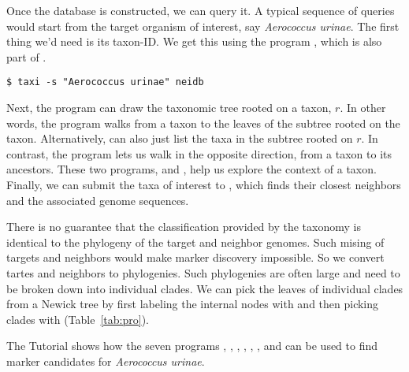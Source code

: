 Once the database is constructed, we can query it. A typical sequence
of queries would start from the target organism of interest,
say \emph{Aerococcus urinae}. The first thing we'd need is its
taxon-ID. We get this using the program , which is also part
of .
\begin{verbatim}
$ taxi -s "Aerococcus urinae" neidb
\end{verbatim}
Next, the program  can draw the taxonomic tree rooted on a
taxon, $r$. In other words, the program  walks from a taxon
to the leaves of the subtree rooted on the
taxon. Alternatively,  can also just list the taxa in the
subtree rooted on $r$. In contrast, the program  lets us walk
in the opposite direction, from a taxon to its ancestors. These two
programs,  and , help us explore the context of a
taxon. Finally, we can submit the taxa of interest to ,
which finds their closest neighbors and the associated genome
sequences.

There is no guarantee that the classification provided by the taxonomy
is identical to the phylogeny of the target and neighbor genomes. Such
mising of targets and neighbors would make marker discovery
impossible. So we convert tartes and neighbors to phylogenies. Such
phylogenies are often large and need to be broken down into individual
clades. We can pick the leaves of individual clades from a Newick tree
by first labeling the internal nodes with  and then picking
clades with  (Table~\ref{tab:pro}).

The Tutorial shows how the seven
programs , , , ,
, , and  can be used
to find marker candidates for \emph{Aerococcus urinae}.
